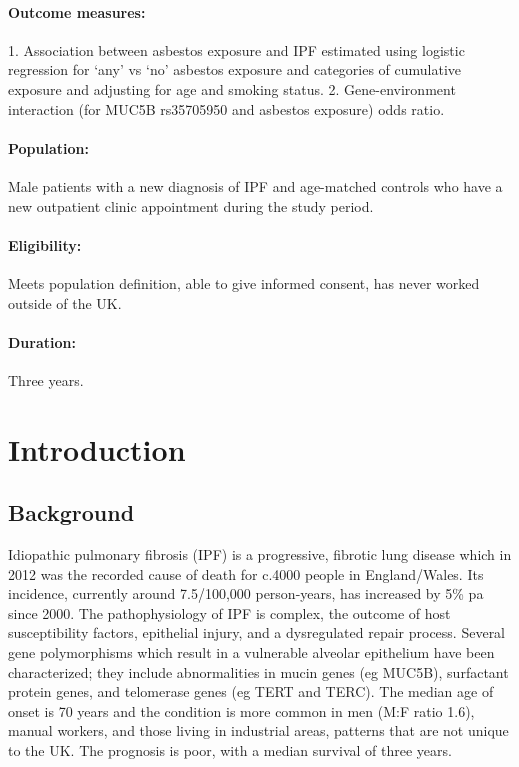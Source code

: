 \documentclass[a4paper,10pt]{article}
\begin{document}
\paragraph{Outcome measures:} 1. Association between asbestos exposure and IPF estimated using logistic regression for ‘any’ vs ‘no’ asbestos exposure and categories of cumulative exposure and adjusting for age and smoking status. 2. Gene-environment interaction (for MUC5B rs35705950 and asbestos exposure) odds ratio.
\paragraph{Population:} Male patients with a new diagnosis of IPF and age-matched controls who have a new outpatient clinic appointment during the study period.
\paragraph{Eligibility:} Meets population definition, able to give informed consent, has never worked outside of the UK.
\paragraph{Duration:} Three years.


\newpage


\section{Introduction}
\subsection{Background}

Idiopathic pulmonary fibrosis (IPF) is a progressive, fibrotic lung disease which in 2012 was the recorded cause of death for c.4000 people in England/Wales. Its incidence, currently around 7.5/100,000 person-years, has increased by 5\% pa since 2000.\cite{Navaratnam2011} The pathophysiology of IPF is complex, the outcome of host susceptibility factors, epithelial injury, and a dysregulated repair process. Several gene polymorphisms which result in a vulnerable alveolar epithelium have been characterized; they include abnormalities in mucin genes (eg MUC5B), surfactant protein genes, and telomerase genes (eg TERT and TERC).\cite{Maher2012}\cite{Ley2013}\cite{Spagnolo2014} The median age of onset is 70 years and the condition is more common in men (M:F ratio 1.6), manual workers, and those living in industrial areas\cite{Navaratnam2011}, patterns that are not unique to the UK.\cite{Ley2013} The prognosis is poor, with a median survival of three years.\cite{Hubbard1998}\cite{Vancheri2010} 
\end{document}
